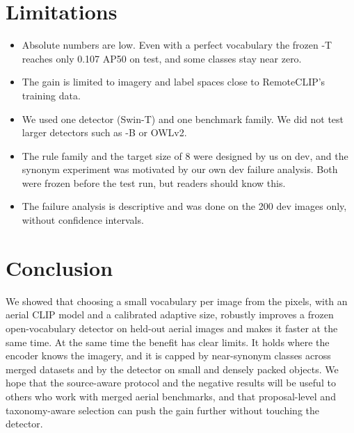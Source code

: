 \section{Limitations}
\label{sec:limits}
\begin{itemize}
  \item Absolute numbers are low. Even with a perfect vocabulary the frozen \gdino-T reaches only 0.107 AP50 on test, and some classes stay near zero.
  \item The gain is limited to imagery and label spaces close to RemoteCLIP's training data.
  \item We used one detector (Swin-T) and one benchmark family. We did not test larger detectors such as \gdino-B or OWLv2.
  \item The rule family and the target size of 8 were designed by us on dev, and the synonym experiment was motivated by our own dev failure analysis. Both were frozen before the test run, but readers should know this.
  \item The failure analysis is descriptive and was done on the 200 dev images only, without confidence intervals.
\end{itemize}

\section{Conclusion}
\label{sec:conclusion}
We showed that choosing a small vocabulary per image from the pixels, with an aerial CLIP model and a calibrated adaptive size, robustly improves a frozen open-vocabulary detector on held-out aerial images and makes it faster at the same time.
At the same time the benefit has clear limits.
It holds where the encoder knows the imagery, and it is capped by near-synonym classes across merged datasets and by the detector on small and densely packed objects.
We hope that the source-aware protocol and the negative results will be useful to others who work with merged aerial benchmarks, and that proposal-level and taxonomy-aware selection can push the gain further without touching the detector.
